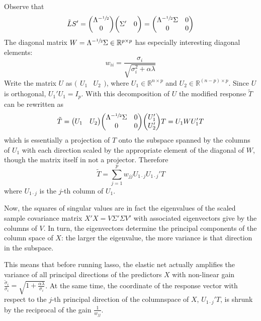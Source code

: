 \documentclass[a4paper]{article}
\newcommand{\Real}{\mathbb{R}}
\begin{document}
Observe that 
\[\tilde{L}S' = \bigg(\begin{matrix}\Lambda^{-\sfrac{1}{2}} \\ 0\end{matrix}\bigg) \bigg(\begin{matrix} \Sigma' & 0 \end{matrix}\bigg) = \bigg(\begin{matrix} \Lambda^{-\sfrac{1}{2}}\Sigma & 0 \\ 0 & 0\end{matrix}\bigg)\]
The diagonal matrix $W = \Lambda^{-\sfrac{1}{2}}\Sigma \in \Real^{p\times p}$ has especially interesting diagonal elements:
\[w_{ii} = \frac{\sigma_i}{\sqrt{ \sigma_i^2 + \alpha\lambda } }\]
Write the matrix $U$ as $\big(\begin{matrix}U_1 & U_2\end{matrix}\big)$, where $U_1\in \Real^{n\times p}$ and $U_2\in \Real^{(n-p)\times p}$.
Since $U$ is orthogonal, $U_1'U_1 = I_p$. With this decomposition of $U$ the modified response $\tilde{T}$ can be rewritten as
\[\tilde{T} = \big(\begin{matrix}U_1 & U_2\end{matrix}\big)\bigg(\begin{matrix} \Lambda^{-\sfrac{1}{2}}\Sigma & 0 \\ 0 & 0\end{matrix}\bigg)\bigg(\begin{matrix}U_1' \\ U_2'\end{matrix}\bigg)T = U_1 W U_1'T \]
which is essentially a projection of $T$ onto the subspace spanned by the columns of $U_1$ with each direction scaled by the appropriate element of the diagonal of $W$, though the matrix itself in not a projector. Therefore
\[\tilde{T} = \sum_{j=1}^p w_{jj} U_{1\cdot j} U_{1\cdot j}'T\]
where $U_{1\cdot j}$ is the $j$-th column of $U_1$.

Now, the squares of singular values are in fact the eigenvalues of the scaled sample covariance matrix $X'X = V\Sigma'\Sigma V'$ with associated eigenvectors give by the columns of $V$. In turn, the eigenvectors determine the principal components of the column space of $X$: the larger the eigenvalue, the more variance is that direction in the subspace.

This means that before running lasso, the elastic net actually amplifies the variance of all principal directions of the predictors $X$ with non-linear gain $\frac{\tilde{\sigma}_i}{\sigma_i} = \sqrt{1+\frac{\alpha\lambda}{\sigma_i}}$. At the same time, the coordinate of the response vector with respect to the $j$-th principal direction of the columnspace of $X$, $U_{1\cdot j}'T$, is shrunk by the reciprocal of the gain $\frac{1}{w_{jj}}$.
\end{document}
